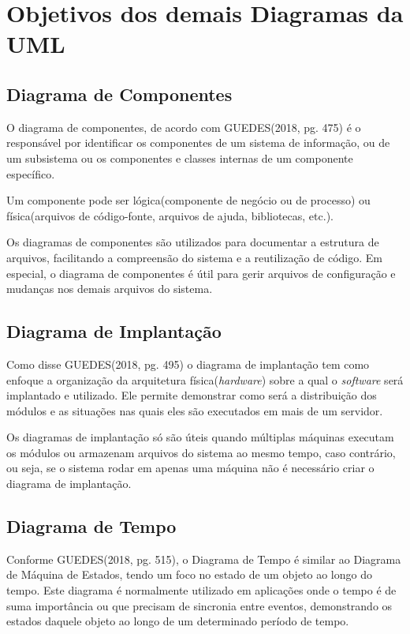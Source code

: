 \documentclass[12pt,openright,oneside,a4paper,
	chapter=TITLE,
	section=TITLE,
	english,brazil]{abntex2}
\begin{document}
\chapter{Objetivos dos demais Diagramas da UML}

\section{Diagrama de Componentes}

O diagrama de componentes, de acordo com GUEDES(2018, pg. 475) é o responsável por identificar os componentes de um sistema de informação, ou de um subsistema ou os componentes e classes internas de um componente específico.

Um componente pode ser lógica(componente de negócio ou de processo) ou física(arquivos de código-fonte, arquivos de ajuda, bibliotecas, etc.).

Os diagramas de componentes são utilizados para documentar a estrutura de arquivos, facilitando a compreensão do sistema e a reutilização de código. Em especial, o diagrama de componentes é útil para gerir arquivos de configuração e mudanças nos demais arquivos do sistema.

\section{Diagrama de Implantação}

Como disse GUEDES(2018, pg. 495) o diagrama de implantação tem como enfoque a organização da arquitetura física(\textit{hardware}) sobre a qual o \textit{software} será implantado e utilizado. Ele permite demonstrar como será a distribuição dos módulos e as situações nas quais eles são executados em mais de um servidor.

Os diagramas de implantação só são úteis quando múltiplas máquinas executam os módulos ou armazenam arquivos do sistema ao mesmo tempo, caso contrário, ou seja, se o sistema rodar em apenas uma máquina não é necessário criar o diagrama de implantação.

\section{Diagrama de Tempo}

Conforme GUEDES(2018, pg. 515), o Diagrama de Tempo é similar ao Diagrama de Máquina de Estados, tendo um foco no estado de um objeto ao longo do tempo. Este diagrama é normalmente utilizado em aplicações onde o tempo é de suma importância ou que precisam de sincronia entre eventos, demonstrando os estados daquele objeto ao longo de um determinado período de tempo.
\end{document}
